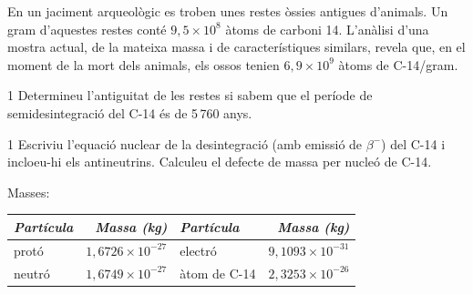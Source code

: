 En un jaciment arqueològic es troben unes restes òssies antigues d'animals. Un gram d'aquestes restes conté $9,5\times 10^{8}$ àtoms de carboni 14. L'anàlisi d'una mostra actual, de la mateixa massa i de característiques similars, revela que, en el moment de la mort dels animals, els ossos tenien $6,9\times 10^{9}$ àtoms de C-14/gram.

\begin{apartat}{1}
Determineu l'antiguitat de les restes si sabem que el període de semidesintegració del C-14 és de 5\,760 anys.
\end{apartat}

\begin{apartat}{1}
Escriviu l'equació nuclear de la desintegració (amb emissió de $\beta^-$) del C-14 i incloeu-hi els antineutrins. Calculeu el defecte de massa per nucleó de C-14.
\end{apartat}


\noindent Masses:
\begin{center}
\begin{tabular}{|l|r|l|r|}
\hline
\textit{Partícula} & \textit{Massa (kg)} & \textit{Partícula} & \textit{Massa (kg)}\\
\hline
protó & $1,6726\times 10^{-27}$ & electró & $9,1093\times 10^{-31}$\\
\hline
neutró & $1,6749\times 10^{-27}$ & àtom de C-14 & $2,3253\times 10^{-26}$\\
\hline
\end{tabular}
\end{center}
